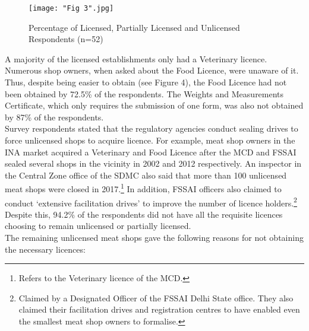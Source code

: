 \documentclass[a4paper, 12pt, twoside]{article}
\begin{document}
\begin{figure}[H]
\centering
\texttt{[image: "Fig 3".jpg]}
\captionsetup{justification=centering}\caption{Percentage of Licensed, Partially Licensed and Unlicensed Respondents (n=52)}
\end{figure} 

A majority of the licensed establishments only had a Veterinary licence. Numerous shop owners, when asked about the Food Licence, were unaware of it. Thus, despite being easier to obtain (see Figure 4), the Food Licence had not been obtained by 72.5\% of the respondents. The Weights and Measurements Certificate, which only requires the submission of one form, was also not obtained by 87\% of the respondents. \\

Survey respondents stated that the regulatory agencies conduct sealing drives to force unlicensed shops to acquire licence. For example, meat shop owners in the INA market acquired a Veterinary and Food Licence after the MCD and FSSAI sealed several shops in the vicinity in 2002 and 2012 respectively. An inspector in the Central Zone office of the SDMC also said that more than 100 unlicensed meat shops were closed in 2017.\footnote{ Refers to the Veterinary licence of the MCD.} In addition, FSSAI officers also claimed to conduct ‘extensive facilitation drives’ to improve the number of licence holders.\footnote{Claimed by a Designated Officer of the FSSAI Delhi State office. They also claimed their facilitation drives and registration centres to have enabled even the smallest meat shop owners to formalise.}
Despite this, 94.2\% of the respondents did not have all the requisite licences choosing to remain unlicensed or partially licensed.\\

The remaining unlicensed meat shops gave the following reasons for not obtaining the necessary licences:
\end{document}
